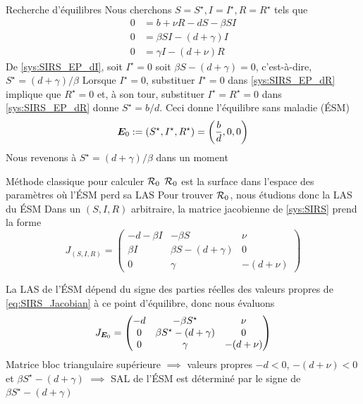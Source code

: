 \documentclass[aspectratio=169]{beamer}\usepackage[]{graphicx}\usepackage[]{xcolor}
\begin{document}
\begin{frame}{Recherche d'équilibres}
Nous cherchons $S=S^\star, I=I^\star, R=R^\star$ tels que
\begin{subequations} \label{sys:SIRS_EP}
\begin{align}
0 &= b+\nu R-dS-\beta SI \label{sys:SIRS_EP_dS} \\
0 &= \beta SI-(d+\gamma) I \label{sys:SIRS_EP_dI} \\
0 &= \gamma I-(d+\nu)R \label{sys:SIRS_EP_dR}
\end{align}    
\end{subequations}
\vfill
De \eqref{sys:SIRS_EP_dI}, soit $I^\star=0$ soit $\beta S-(d+\gamma)=0$, c'est-à-dire, $S^\star=(d+\gamma)/\beta$
\vfill
Lorsque $I^\star=0$, substituer $I^\star=0$ dans \eqref{sys:SIRS_EP_dR} implique que $R^\star=0$ et, à son tour, substituer $I^\star=R^\star=0$ dans \eqref{sys:SIRS_EP_dR} donne $S^\star=b/d$. Ceci donne l'équilibre sans maladie (ÉSM)
\begin{equation}\label{eq:SIRS_DFE}
\bm{E}_0:=(S^\star,I^\star,R^\star)=
\left(\frac bd, 0, 0\right)
\end{equation}
\vfill
Nous revenons à $S^\star=(d+\gamma)/\beta$ dans un moment
\end{frame}



\begin{frame}{Méthode classique pour calculer $\mathcal{R}_0$}
$\mathcal{R}_0$ est la surface dans l'espace des paramètres où l'ÉSM perd sa LAS
\vfill
Pour trouver $\mathcal{R}_0$, nous étudions donc la LAS du ÉSM
\vfill
Dans un $(S,I,R)$ arbitraire, la matrice jacobienne de \eqref{sys:SIRS} prend la forme
\begin{equation}
\label{eq:SIRS_Jacobian}
J_{(S,I,R)} =
\begin{pmatrix}
-d-\beta I & -\beta S & \nu \\
\beta I & \beta S-(d+\gamma) & 0 \\
0 & \gamma & -(d+\nu)
\end{pmatrix}
\end{equation}
\end{frame}

\begin{frame}
La LAS de l'ÉSM dépend du signe des parties réelles des valeurs propres de \eqref{eq:SIRS_Jacobian} à ce point d'équilibre, donc nous évaluons
\begin{equation}
\label{eq:SIRS_Jacobian_DFE}
J_{\bm{E}_0} =
\begin{pmatrix}
-d & -\beta S^\star & \nu \\
0 & \beta S^\star-(d+\gamma) & 0 \\
0 & \gamma & -(d+\nu)
\end{pmatrix}
\end{equation}
\vfill
Matrice bloc triangulaire supérieure $\implies$ valeurs propres $-d<0$, $-(d+\nu)<0$ et $\beta S^\star-(d+\gamma)$ 
\vfill
$\implies$ SAL de l'ÉSM est déterminé par le signe de $\beta S^\star-(d+\gamma)$
\end{frame}
\end{document}
